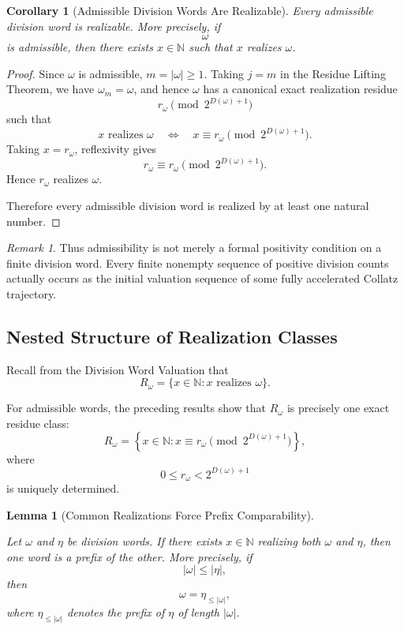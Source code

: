 \documentclass[12pt, oneside]{article}
\numberwithin{equation}{section}
\theoremstyle{definition}
\theoremstyle{plain}
\newtheorem{lemma}[theorem]{Lemma}
\newtheorem{corollary}[theorem]{Corollary}
\theoremstyle{remark}
\newtheorem*{remark}{Remark}
\begin{document}
\begin{corollary}[Admissible Division Words Are Realizable]
\label{cor:admissible-words-realizable}
Every admissible division word is realizable. More precisely, if
\[
\omega
\]
is admissible, then there exists \(x\in\mathbb N\) such that \(x\)
realizes \(\omega\).
\end{corollary}

\begin{proof}
Since \(\omega\) is admissible, \(m=|\omega|\ge1\). Taking \(j=m\) in
the Residue Lifting Theorem, we have \(\omega_m=\omega\), and hence
\(\omega\) has a canonical exact realization residue
\[
r_\omega \pmod{2^{D(\omega)+1}}
\]
such that
\[
x\text{ realizes }\omega \quad\Longleftrightarrow\quad x\equiv r_\omega \pmod{2^{D(\omega)+1}}.
\]
Taking \(x=r_\omega\), reflexivity gives
\[
r_\omega\equiv r_\omega \pmod{2^{D(\omega)+1}}.
\]
Hence \(r_\omega\) realizes \(\omega\).

Therefore every admissible division word is realized by at least one
natural number.
\end{proof}

\begin{remark}
Thus admissibility is not merely a formal positivity condition on a finite
division word. Every finite nonempty sequence of positive division counts
actually occurs as the initial valuation sequence of some fully accelerated
Collatz trajectory.
\end{remark}


\subsection{Nested Structure of Realization Classes}

Recall from the Division Word Valuation that
\[
R_\omega = \{x\in\mathbb{N} : x \text{ realizes } \omega\}.
\]

For admissible words, the preceding results show that \(R_\omega\) is
precisely one exact residue class:
\[
R_\omega = \left\{
x\in\mathbb{N} :
x\equiv r_\omega
\pmod{2^{D(\omega)+1}}
\right\},
\]
where
\[
0\le r_\omega<2^{D(\omega)+1}
\]
is uniquely determined.

\begin{lemma}[Common Realizations Force Prefix Comparability]
\label{lem:common-realization-prefix}

Let \(\omega\) and \(\eta\) be division words. If there exists
\(x\in\mathbb{N}\) realizing both \(\omega\) and \(\eta\), then one word
is a prefix of the other.  More precisely, if
\[
|\omega|\le |\eta|,
\]
then
\[
\omega = \eta_{\le |\omega|},
\]
where \(\eta_{\le |\omega|}\) denotes the prefix of \(\eta\) of length
\(|\omega|\).
\end{lemma}
\end{document}
